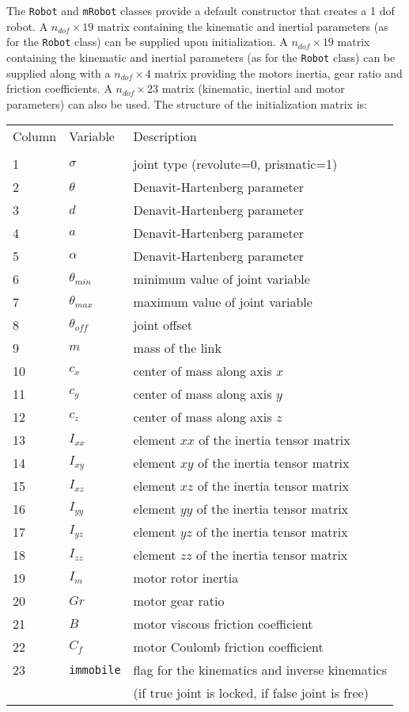 \documentclass[11pt,fleqn,letterpaper]{report}
\begin{document}
The \texttt{Robot} and \texttt{mRobot} classes provide a default
constructor that creates a 1 dof robot.  A $n_{dof} \times 19$ matrix
containing the kinematic and inertial parameters (as for the
\texttt{Robot} class) can be supplied upon initialization. A $n_{dof}
\times 19$ matrix containing the kinematic and inertial parameters (as
for the \texttt{Robot} class) can be supplied along with a $n_{dof}
\times 4$ matrix providing the motors inertia, gear ratio and friction
coefficients. A $n_{dof} \times 23$ matrix (kinematic, inertial and
motor parameters) can also be used.  The structure of the
initialization matrix is:

\vspace{0.2in}

\begin{tabular}{lll}
Column & Variable & Description \\
\\
1 & $\sigma$ & joint type (revolute=0, prismatic=1) \\
2 & $\theta$ & Denavit-Hartenberg parameter \\
3 & $d$ & Denavit-Hartenberg parameter \\
4 & $a$ & Denavit-Hartenberg parameter \\
5 & $\alpha$ & Denavit-Hartenberg parameter \\
6 & $\theta_{min}$ & minimum value of joint variable \\
7 & $\theta_{max}$ & maximum value of joint variable \\
8 & $\theta_{off}$ & joint offset \\
9 & $m$ & mass of the link \\
10 & $c_x$ & center of mass along axis $x$ \\
11 & $c_y$ & center of mass along axis $y$ \\
12 & $c_z$ & center of mass along axis $z$ \\
13 & $I_{xx}$ & element $xx$ of the inertia tensor matrix \\
14 & $I_{xy}$ & element $xy$ of the inertia tensor matrix \\
15 & $I_{xz}$ & element $xz$ of the inertia tensor matrix \\
16 & $I_{yy}$ & element $yy$ of the inertia tensor matrix \\
17 & $I_{yz}$ & element $yz$ of the inertia tensor matrix \\
18 & $I_{zz}$ & element $zz$ of the inertia tensor matrix \\
19 & $I_m$ & motor rotor inertia \\
20 & $Gr$ & motor gear ratio \\
21 & $B$ & motor viscous friction coefficient \\
22 & $C_f$ & motor Coulomb friction coefficient \\
23 & \texttt{immobile} & flag for the kinematics and inverse kinematics \\
& & (if true joint is locked, if false joint is free)
\end{tabular}
\end{document}

